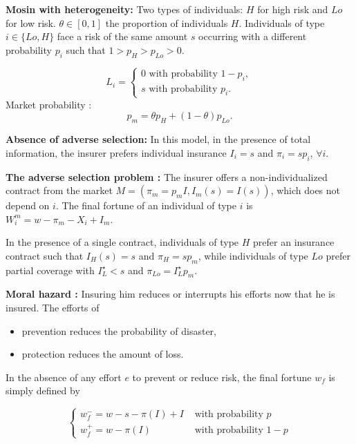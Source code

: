 \begin{f}
	
	\textbf{Mosin with heterogeneity:} Two types of individuals: \(H\) for high risk and \(Lo\) for low risk. \(\theta \in[0,1]\) the proportion of individuals \(H\). Individuals of type \(i \in\{Lo, H\}\) face a risk of the same amount \(s\) occurring with a different probability \(p_{i}\) such that \(1>p_{H}>p_{Lo}>0\).
	
	\[
	L_{i}=\left\{\begin{array}{l}
		0 \text { with probability } 1-p_{i}, \\
		s \text { with probability } p_{i} .
	\end{array}\right.
	\]
Market probability :
	\[
	p_{m}=\theta p_{H}+(1-\theta) p_{Lo} .
	\]
\medskip

\textbf{Absence of adverse selection:} In this model, in the presence of total information, the insurer prefers individual insurance \(I_{i}=s\) and \(\pi_{i}=s p_{i}\), \(\forall i\).

\textbf{The adverse selection problem : }
The insurer offers a non-individualized contract from the market \(M=\left(\pi_{m}=p_{m} I, I_{m}(s)=I(s)\right)\), which does not depend on \(i\). The final fortune of an individual of type \(i\) is \(W_{i}^{m}=w-\pi_{m}-X_{i}+I_{m}\).

In the presence of a single contract, individuals of type \(H\) prefer an insurance contract such that \(I_{H}(s)=s\) and \(\pi_{H}=s p_{m}\), while individuals of type \(Lo\) prefer partial coverage with \(I_{L}^{\star}<s\) and \(\pi_{Lo}=I_{L}^{\star} p_{m}\).
\medskip

\textbf{Moral hazard :}
Insuring him reduces or interrupts his efforts now that he is insured. The efforts of
\begin{itemize}
	\item prevention reduces the probability of disaster,
	\item protection reduces the amount of loss.
\end{itemize}

 In the absence of any effort \(e\) to prevent or reduce risk, the final fortune \(w_{f}\) is simply defined by

\[
\begin{cases}w_{f}^{-}=w-s-\pi(I)+I & \text { with probability } p \\ w_{f}^{+}=w-\pi(I) & \text { with probability } 1-p\end{cases}
\]


\end{f}
